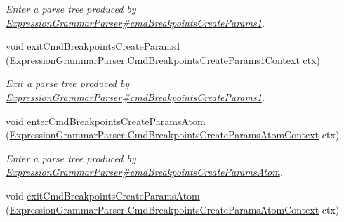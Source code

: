 \begin{DoxyCompactItemize}
\begin{DoxyCompactList}\small\item\em Enter a parse tree produced by \hyperlink{classgov_1_1nasa_1_1jpf_1_1inspector_1_1server_1_1expression_1_1parser_1_1_expression_grammar_parser_aa16584e37b631f4c0cdd1b148deda9df}{Expression\+Grammar\+Parser\#cmd\+Breakpoints\+Create\+Params1}. \end{DoxyCompactList}\item 
void \hyperlink{interfacegov_1_1nasa_1_1jpf_1_1inspector_1_1server_1_1expression_1_1parser_1_1_expression_grammar_listener_a6e4d09f38c03b057ee9e47bda3f3f861}{exit\+Cmd\+Breakpoints\+Create\+Params1} (\hyperlink{classgov_1_1nasa_1_1jpf_1_1inspector_1_1server_1_1expression_1_1parser_1_1_expression_grammar_pa96543943a9acc7eb3cd37320a4fc3ee4}{Expression\+Grammar\+Parser.\+Cmd\+Breakpoints\+Create\+Params1\+Context} ctx)
\begin{DoxyCompactList}\small\item\em Exit a parse tree produced by \hyperlink{classgov_1_1nasa_1_1jpf_1_1inspector_1_1server_1_1expression_1_1parser_1_1_expression_grammar_parser_aa16584e37b631f4c0cdd1b148deda9df}{Expression\+Grammar\+Parser\#cmd\+Breakpoints\+Create\+Params1}. \end{DoxyCompactList}\item 
void \hyperlink{interfacegov_1_1nasa_1_1jpf_1_1inspector_1_1server_1_1expression_1_1parser_1_1_expression_grammar_listener_a1ccbceb188171779b83fc6f119e96f45}{enter\+Cmd\+Breakpoints\+Create\+Params\+Atom} (\hyperlink{classgov_1_1nasa_1_1jpf_1_1inspector_1_1server_1_1expression_1_1parser_1_1_expression_grammar_paa3acc222754f42ff002c5d98d8d38136}{Expression\+Grammar\+Parser.\+Cmd\+Breakpoints\+Create\+Params\+Atom\+Context} ctx)
\begin{DoxyCompactList}\small\item\em Enter a parse tree produced by \hyperlink{classgov_1_1nasa_1_1jpf_1_1inspector_1_1server_1_1expression_1_1parser_1_1_expression_grammar_parser_af5febf5689be29b485c8497738ef35fc}{Expression\+Grammar\+Parser\#cmd\+Breakpoints\+Create\+Params\+Atom}. \end{DoxyCompactList}\item 
void \hyperlink{interfacegov_1_1nasa_1_1jpf_1_1inspector_1_1server_1_1expression_1_1parser_1_1_expression_grammar_listener_ae21191305b4fdface3cf6dae866db48e}{exit\+Cmd\+Breakpoints\+Create\+Params\+Atom} (\hyperlink{classgov_1_1nasa_1_1jpf_1_1inspector_1_1server_1_1expression_1_1parser_1_1_expression_grammar_paa3acc222754f42ff002c5d98d8d38136}{Expression\+Grammar\+Parser.\+Cmd\+Breakpoints\+Create\+Params\+Atom\+Context} ctx)

\end{DoxyCompactItemize}
